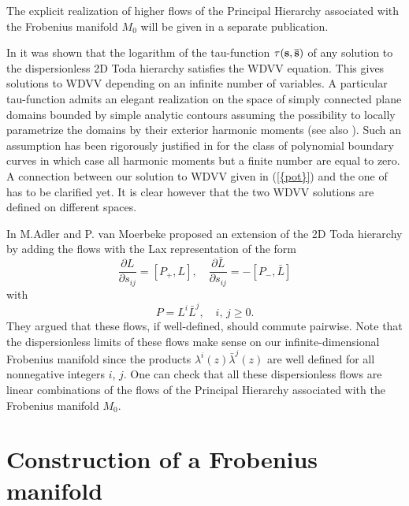 \documentclass[numbook, envcountsame, envcountreset]{svjour3}
\begin{document}
The explicit realization of higher flows of the Principal Hierarchy associated with the Frobenius manifold $M_0$ will be given in a separate publication.

\begin{remark} In \cite{bmrwz,krich}  it was shown that the logarithm of the tau-function $\tau ({\bf s}, {\bf \bar s})$ of any solution to the dispersionless 2D Toda hierarchy satisfies the WDVV equation. This gives solutions to WDVV depending on an infinite number of variables. A particular tau-function admits an elegant realization on the space of simply connected plane domains bounded by simple analytic contours assuming the possibility to locally parametrize the domains by their exterior harmonic moments (see also \cite{takh}). Such an assumption has been rigorously justified in \cite{ef} for the class of polynomial boundary curves in which case all harmonic moments but a finite number are equal to zero. A connection between our solution to WDVV given in {(\ref{{pot}})} and the one of \cite{bmrwz,krich} has to be clarified yet. It is clear however that the two WDVV solutions are defined on different spaces.
\end{remark}

\begin{remark} In \cite{am} M.Adler and P. van Moerbeke proposed an extension of the 2D Toda hierarchy by adding the flows with the Lax representation of the form
\begin{equation}\label{avm1}
\frac{{\partial} L}{{\partial} s_{ij}} = \left[ P_+ , L\right], \quad \frac{{\partial} \bar L}{{\partial} s_{ij}}
=-\left[ P_-, \bar L\right]
\end{equation}
with
\begin{equation}\label{avm2}
P=L^i \bar L^j, \quad i, \, j\geq 0.
\end{equation}
They argued that these flows, if well-defined, should commute pairwise. Note that the dispersionless limits of these flows make sense on our infinite-dimensional Frobenius manifold since the products $\lambda^i(z) \bar\lambda^j(z)$ are well defined for all nonnegative integers $i$, $j$. One can check that all these dispersionless flows are linear combinations of the flows of the Principal Hierarchy associated with the Frobenius manifold $M_0$.
\end{remark}

\section{Construction of a Frobenius manifold}\label{sec2}\par
\end{document}

